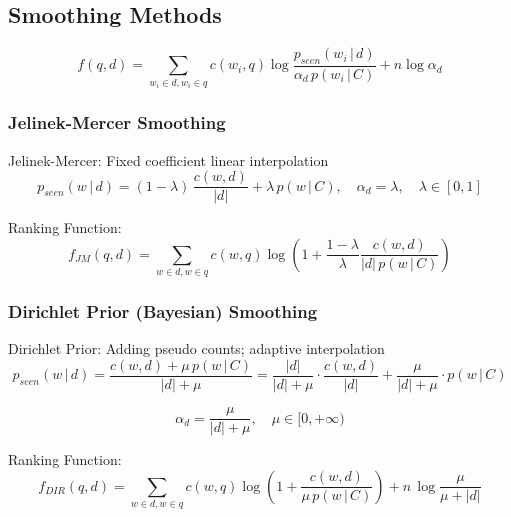 \subsection{Smoothing Methods}
\begin{equation*}
f(q, d) = \sum_{w_i \in d, w_i \in q} c(w_i, q) \log \frac{p_{seen}(w_i \,\big|\, d)}{\alpha_d \, p(w_i \,\big|\, C)} + n \log \alpha_d
\end{equation*}

\subsubsection{Jelinek-Mercer Smoothing}
Jelinek-Mercer: Fixed coefficient linear interpolation
\begin{equation*}
p_{seen}(w \,\big|\, d) = (1-\lambda) \, \dfrac{c(w, d)}{|d|} + \lambda \, p(w \,\big|\, C), \quad \alpha_d = \lambda, \quad \lambda \in [0, 1]
\end{equation*}

Ranking Function:
\begin{equation*}
f_{JM}(q, d) = \sum_{w \in d, w \in q} c(w, q) \log \left( 1 + \frac{1-\lambda}{\lambda} \frac{c(w, d)}{|d| \, p(w \,\big|\, C)} \right)
\end{equation*}

\subsubsection{Dirichlet Prior (Bayesian) Smoothing}
Dirichlet Prior: Adding pseudo counts; adaptive interpolation
\begin{equation*}
p_{seen}(w \,\big|\, d) = \dfrac{c(w, d) + \mu \, p(w \,\big|\, C)}{|d| + \mu} = \dfrac{|d|}{|d| + \mu}\cdot\dfrac{c(w,d)}{|d|} + \dfrac{\mu}{|d| + \mu}\cdot p(w \,\big|\, C)
\end{equation*}

\begin{equation*}
\alpha_d = \frac{\mu}{|d| + \mu}, \quad \mu \in [0, +\infty)
\end{equation*}

Ranking Function:
\begin{equation*}
f_{DIR}(q, d) = \sum_{w \in d, w \in q} c(w, q) \log \left( 1 + \frac{c(w, d)}{\mu \, p(w \,\big|\, C)} \right) + n\,\log\frac{\mu}{\mu + |d|}
\end{equation*}

